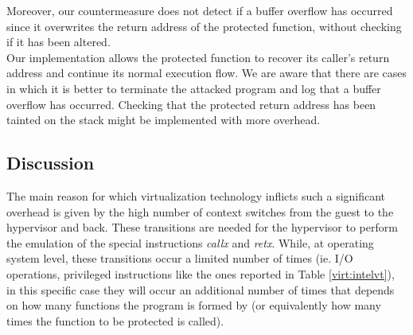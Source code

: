 
Moreover, our countermeasure does not detect if a buffer overflow has occurred since it overwrites the return address of the protected function, without checking if it has been altered.\\
Our implementation allows the protected function to recover its caller's return address and continue its normal execution flow. We are aware that there are cases in which it is better to terminate the attacked program and log that a buffer overflow has occurred. Checking that the protected return address has been tainted on the stack might be implemented with more overhead.\\

\subsection{Discussion}
The main reason for which virtualization technology inflicts such a significant overhead is given by the high number of context switches from the guest to the hypervisor and back. These transitions are needed for the hypervisor to perform the emulation of the special instructions \emph{callx} and \emph{retx}. 
While, at operating system level, these transitions occur a limited number of times (ie. I/O operations, privileged instructions like the ones reported in Table \ref{virt:intelvt}), in this specific case they will occur an additional number of times that depends on how many functions the program is formed by (or equivalently how many times the function to be protected is called). 

